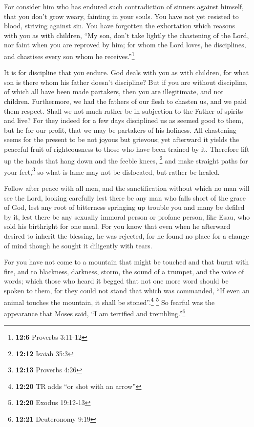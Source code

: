  For consider him who has endured such contradiction of
sinners against himself, that you don't grow weary, fainting in your
souls.  You have not yet resisted to blood, striving
against sin.  You have forgotten the exhortation which
reasons with you as with children, ``My son, don't take lightly the
chastening of the Lord, nor faint when you are reproved by him;
 for whom the Lord loves, he disciplines, and chastises
every son whom he receives.''\footnote{\textbf{12:6} Proverbs 3:11-12}

 It is for discipline that you endure. God deals with you
as with children, for what son is there whom his father doesn't
discipline?  But if you are without discipline, of which
all have been made partakers, then you are illegitimate, and not
children.  Furthermore, we had the fathers of our flesh to
chasten us, and we paid them respect. Shall we not much rather be in
subjection to the Father of spirits and live?  For they
indeed for a few days disciplined us as seemed good to them, but he for
our profit, that we may be partakers of his holiness. 
All chastening seems for the present to be not joyous but grievous; yet
afterward it yields the peaceful fruit of righteousness to those who
have been trained by it.  Therefore lift up the hands
that hang down and the feeble knees, \footnote{\textbf{12:12} Isaiah
  35:3}  and make straight paths for your
feet,\footnote{\textbf{12:13} Proverbs 4:26} so what is lame may not be
dislocated, but rather be healed.

 Follow after peace with all men, and the sanctification
without which no man will see the Lord,  looking
carefully lest there be any man who falls short of the grace of God,
lest any root of bitterness springing up trouble you and many be defiled
by it,  lest there be any sexually immoral person or
profane person, like Esau, who sold his birthright for one meal.
 For you know that even when he afterward desired to
inherit the blessing, he was rejected, for he found no place for a
change of mind though he sought it diligently with tears.

 For you have not come to a mountain that might be
touched and that burnt with fire, and to blackness, darkness, storm,
 the sound of a trumpet, and the voice of words; which
those who heard it begged that not one more word should be spoken to
them,  for they could not stand that which was commanded,
``If even an animal touches the mountain, it shall be
stoned''.\footnote{\textbf{12:20} TR adds ``or shot with an arrow''}
\footnote{\textbf{12:20} Exodus 19:12-13}  So fearful was
the appearance that Moses said, ``I am terrified and
trembling.''\footnote{\textbf{12:21} Deuteronomy 9:19}

